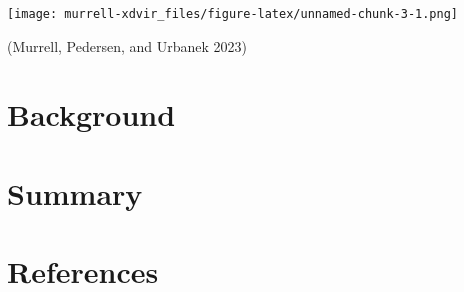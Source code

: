 \texttt{[image: murrell-xdvir\_files/figure-latex/unnamed-chunk-3-1.png]}

(Murrell, Pedersen, and Urbanek 2023)

\hypertarget{background}{%
\section{Background}\label{background}}

\hypertarget{summary}{%
\section{Summary}\label{summary}}

\hypertarget{references}{%
\section*{References}\label{references}}

